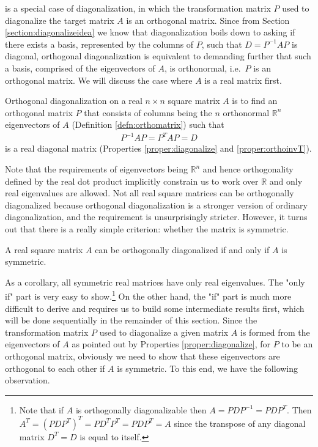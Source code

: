  is a special case of diagonalization, in which the transformation matrix $P$ used to diagonalize the target matrix $A$ is an orthogonal matrix. Since from Section \ref{section:diagonalizeidea} we know that diagonalization boils down to asking if there exists a basis, represented by the columns of $P$, such that $D = P^{-1}AP$ is diagonal, orthogonal diagonalization is equivalent to demanding further that such a basis, comprised of the eigenvectors of $A$, is orthonormal, i.e.\ $P$ is an orthogonal matrix. We will discuss the case where $A$ is a real matrix first.
\begin{defn}
\label{defn:orthodiagonal}
Orthogonal diagonalization on a real $n \times n$ square matrix $A$ is to find an orthogonal matrix $P$ that consists of columns being the $n$ orthonormal $\mathbb{R}^n$ eigenvectors of $A$ (Definition \ref{defn:orthomatrix}) such that
\begin{align}
P^{-1}AP = P^TAP = D \label{eqn:orthodiagonalPAP} 
\end{align}
is a real diagonal matrix (Properties \ref{proper:diagonalize} and \ref{proper:orthoinvT}).
\end{defn}
Note that the requirements of eigenvectors being $\mathbb{R}^n$ and hence orthogonality defined by the real dot product implicitly constrain us to work over $\mathbb{R}$ and only real eigenvalues are allowed. Not all real square matrices can be orthogonally diagonalized because orthogonal diagonalization is a stronger version of ordinary diagonalization, and the requirement is unsurprisingly stricter. However, it turns out that there is a really simple criterion: whether the matrix is symmetric.
\begin{thm}
\label{thm:symdiag}
A real square matrix $A$ can be orthogonally diagonalized if and only if $A$ is symmetric.
\end{thm}
As a corollary, all symmetric real matrices have only real eigenvalues. The "only if" part is very easy to show.\footnote{Note that if $A$ is orthogonally diagonalizable then $A = PDP^{-1} = PDP^T$. Then $A^T = (PDP^T)^T = PD^TP^T = PDP^T = A$ since the transpose of any diagonal matrix $D^T = D$ is equal to itself.} On the other hand, the "if" part is much more difficult to derive and requires us to build some intermediate results first, which will be done sequentially in the remainder of this section. Since the transformation matrix $P$ used to diagonalize a given matrix $A$ is formed from the eigenvectors of $A$ as pointed out by Properties \ref{proper:diagonalize}, for $P$ to be an orthogonal matrix, obviously we need to show that these eigenvectors are orthogonal to each other if $A$ is symmetric. To this end, we have the following observation.
